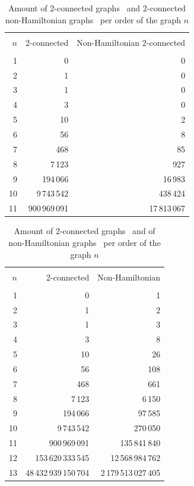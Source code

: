 \begin{table}
  \centering
  \caption{Amount of 2-connected graphs~\cite{data:integer-sequence} and 2-connected non-Hamiltonian graphs~\cite{lib:UHG} per order of the graph $n$}
  \label{tab:2con-nonhamil-2con}
  \begin{tabular}{rrr}
    \hline\\
    $n$ & 2-connected & Non-Hamiltonian 2-connected \\
    \hline \\
    1 & 0 & 0 \\
    2 & 1 & 0 \\
    3 & 1 & 0 \\
    4 & 3 & 0 \\
    5 & 10 & 2 \\
    6 & 56 & 8 \\
    7 & 468 & 85 \\
    8	& 7\,123 & 927 \\
    9	& 194\,066 & 16\,983 \\
    10 & 9\,743\,542 & 438\,424 \\
    11 & 900\,969\,091 & 17\,813\,067 \\
    \hline
  \end{tabular}
\end{table}

\begin{table}
  \centering
  \caption{Amount of 2-connected graphs~\cite{data:integer-sequence} and of non-Hamiltonian graphs~\cite{lib:UHG} per order of the graph $n$}
  \label{tab:2con-nonhamil}
  \begin{tabular}{rrr}
    \hline\\
    $n$ & 2-connected & Non-Hamiltonian \\
    \hline \\
    1 & 0 & 1 \\
    2 & 1 & 2 \\
    3 & 1 & 3 \\
    4 & 3 & 8 \\
    5 & 10 & 26 \\
    6 & 56 & 108 \\
    7 & 468 & 661 \\
    8	& 7\,123 & 6\,150 \\
    9	& 194\,066 & 97\,585 \\
    10 & 9\,743\,542 & 270\,050 \\
    11 & 900\,969\,091 & 135\,841\,840 \\
    12 & 153\,620\,333\,545 & 12\,568\,984\,762 \\
    13 & 48\,432\,939\,150\,704 & 2\,179\,513\,027\,405 \\
    \hline
  \end{tabular}
\end{table}

